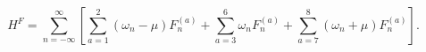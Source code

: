 \begin{equation}\label{eq:IIB2HF}
H^F = \sum_{n=-\infty}^{\infty}
        \left[
           \sum_{a=1}^{2} \left( \omega_n - \mu \right) F^{(a)}_n +
           \sum_{a=3}^{6}  \omega_n F^{(a)}_n +
           \sum_{a=7}^{8} \left( \omega_n + \mu \right) F^{(a)}_n
        \right].
\end{equation}

